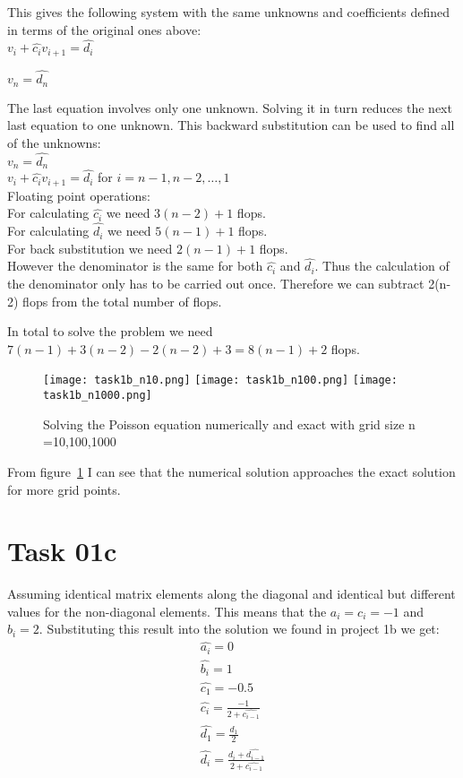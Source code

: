 This gives the following system with the same unknowns and coefficients defined in terms of the original ones above: \\

$v_i + \hat{c_i} v_{i+1} = \hat{d_i}$

$v_n = \hat{d_n}$

The last equation involves only one unknown. Solving it in turn reduces the next last equation to one unknown. This backward substitution can be used to find all of the unknowns: \\
$v_n = \hat{d_n}$  \\
$v_i + \hat{c_i} v_{i+1} = \hat{d_i}$ for $i = n-1, n-2, \ldots, 1$ \\

Floating point operations: \\

For calculating $\hat{c_i}$ we need $3(n-2)+1$ flops. \\
For calculating $\hat{d_i}$ we need $5(n-1)+1$ flops. \\
For back substitution we need $2(n-1)+1$ flops. \\

However the denominator is the same for both $\hat{c_i}$ and $\hat{d_i}$. Thus the calculation of the denominator only has to be carried out once. Therefore we can subtract 2(n-2) flops from the total number of flops.


In total to solve the problem we need $7(n-1)+3(n-2)-2(n-2)+3 = 8(n-1)+2$ flops. \\


\FloatBarrier
\begin{figure}[!ht]
\centering
\FloatBarrier
\texttt{[image: task1b\_n10.png]}
\texttt{[image: task1b\_n100.png]}
\texttt{[image: task1b\_n1000.png]}
\caption{Solving the Poisson equation numerically and exact with grid size n =10,100,1000}
\label{fig:Poisson}
\end{figure}
\FloatBarrier

From figure~\ref{fig:Poisson} I can see that the numerical solution approaches the exact solution for more grid points. \\


\section{Task 01c}

Assuming identical matrix elements along the diagonal and identical  but different values for the non-diagonal elements. This means that the $a_i =c_i =-1$ and $b_i =2$. Substituting this result into the solution we found in project 1b we get:
\begin{gather*}
	\hat{a_i} = 0 \\
	\hat{b_i} = 1 \\
	\hat{c_1} = -0.5 \\
	\hat{c_i} = \frac{-1}{2 + \hat{c_{i-1}}} \\
	\hat{d_1} = \frac{d_1}{2}  \\
	\hat{d_i} = \frac{d_i + \hat{d_{i-1}}}{2 + \hat{c_{i-1}}} \\
\end{gather*}


